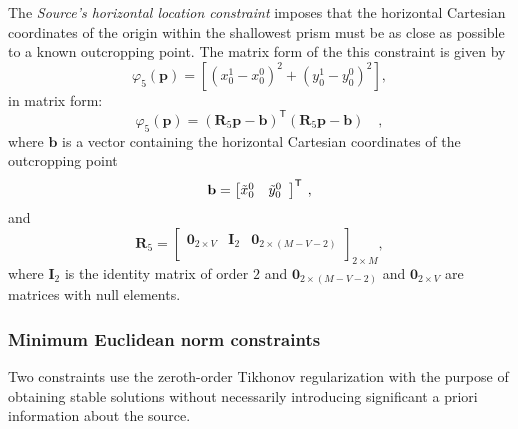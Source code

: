 The \textit{Source's horizontal location constraint} imposes that the horizontal Cartesian coordinates of the origin within 
the shallowest prism must be as close as possible to a known outcropping point. The matrix form of the this constraint is given by
\begin{equation}\label{eq:phi5_sum}
\varphi_{5}(\mathbf{p}) = \left[\left(x_{0}^{1} - x_{0}^{0}\right)^2 + \left(y_{0}^{1} - y_0^0\right)^2\right] ,
\end{equation}
in matrix form:
\begin{equation}\label{eq:phi5}
\varphi_{5}(\mathbf{p}) = \left(\mathbf{R}_{5} \mathbf{p} - \mathbf{b} \right)^{\mathsf{T}}
\left(\mathbf{R}_{5} \mathbf{p} - \mathbf{b}\right) \quad ,
\end{equation}
where $\mathbf{b}$ is a vector containing the horizontal Cartesian coordinates of the outcropping point 
\begin{equation}
\mathbf{b} = \left[ \begin{array}{@{}*{12}{c}@{}}
\tilde{x}_{0}^{0} & \tilde{y}_{0}^{0} \\
\end{array} \right]^{\mathsf{T}} \: ,
\label{eq:b-vector}
\end{equation}
and
\begin{equation}
\mathbf{R}_{5} = 
\begin{bmatrix}
\mathbf{0}_{2 \times V} & \mathbf{I}_{2} & \mathbf{0}_{2 \times (M-V-2)} \\
\end{bmatrix}_{2 \times M},
\label{eq:R5-matrix}
\end{equation}
where $\mathbf{I}_{2}$ is the identity matrix of order $2$ and $\mathbf{0}_{2 \times (M-V-2)}$ and 
$\mathbf{0}_{2 \times V}$ are matrices with null elements.

\subsubsection{Minimum Euclidean norm constraints}

Two constraints use the zeroth-order Tikhonov regularization with the purpose of obtaining stable solutions without necessarily introducing significant a priori information about the source. 

